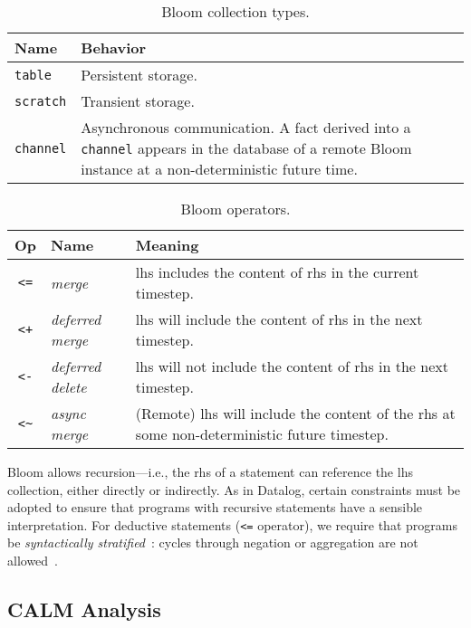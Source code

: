 \begin{table}[t]
\centering
\begin{tabular}{|l|p{2.32in}|}
\hline
\textbf{Name} & \textbf{Behavior }\\
\hline
\texttt{table} & Persistent storage.\\
\texttt{scratch} & Transient storage.\\
\texttt{channel} & Asynchronous communication. A fact derived into a \texttt{channel} appears in the
database of a remote Bloom instance at a non-deterministic future time.\\
\hline
\end{tabular}
\caption{Bloom collection types.}
\label{tbl:bloom-collections}
\end{table}
\begin{table}
\begin{tabular}{|c|l|p{1.85in}|}
\hline
\textbf{Op} & \textbf{Name} & \textbf{Meaning} \\
\hline
\verb|<=| & \emph{merge} & lhs includes the content of rhs in the
current timestep. \\
\hline
\verb|<+| & \emph{deferred merge} & lhs will include the content of rhs in the
next timestep. \\
\hline
\verb|<-| & \emph{deferred delete} & lhs will not include the content of rhs
in the next timestep. \\
\hline
\verb|<~| & \emph{async merge} & (Remote) lhs will include the content of the
rhs at some non-deterministic future timestep. \\
\hline
\end{tabular}
\caption{Bloom operators.}
\label{tbl:bloom-ops}
\end{table}

Bloom allows recursion---i.e., the rhs of a statement can reference the lhs
collection, either directly or indirectly. As in Datalog, certain constraints
must be adopted to ensure that programs with recursive statements have a
sensible interpretation. For deductive statements (\verb+<=+ operator), we
require that programs be \emph{syntactically stratified}~\cite{Apt1988}: cycles
through negation or aggregation are not allowed~\cite{dedalus}.

\subsection{CALM Analysis}
\label{sec:bg-calm}

